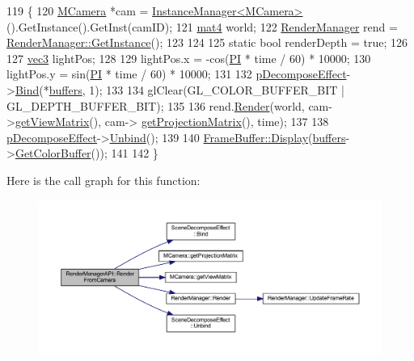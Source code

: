 \begin{DoxyCode}
119 \{
120     \hyperlink{class_m_camera}{MCamera} *cam = \hyperlink{class_instance_manager}{InstanceManager<MCamera>}().GetInstance().GetInst(camID);
121     \hyperlink{_types_8h_a2db59f395fe82a7394c6324956c265d8}{mat4} world;
122     \hyperlink{class_render_manager}{RenderManager} rend = \hyperlink{class_singleton_a74f32751d99bf3cc95fe17aba11f4b07}{RenderManager::GetInstance}();
123 
124 
125     \textcolor{keyword}{static} \textcolor{keywordtype}{bool} renderDepth = \textcolor{keyword}{true};
126         
127     \hyperlink{_types_8h_a3d0ce73e3199de81565fb01632415288}{vec3} lightPos;
128 
129     lightPos.x = -cos(\hyperlink{_m_math_8h_a598a3330b3c21701223ee0ca14316eca}{PI} * time / 60) * 10000;
130     lightPos.y = sin(\hyperlink{_m_math_8h_a598a3330b3c21701223ee0ca14316eca}{PI} * time / 60) * 10000;
131         
132     \hyperlink{_render_manager_a_p_i_8cpp_a7cab16375909f127703d305e85ccf50b}{pDecomposeEffect}->\hyperlink{class_scene_decompose_effect_a2c2bbdba7d4a8cbe1988f56b02754118}{Bind}(*\hyperlink{_render_manager_a_p_i_8cpp_a3e255706d276f815cf3fbafbbfe660f8}{buffers}, 1);
133             
134     glClear(GL\_COLOR\_BUFFER\_BIT | GL\_DEPTH\_BUFFER\_BIT);
135         
136     rend.\hyperlink{class_render_manager_aa51d440b124cf2a1744655b1b24369f5}{Render}(world, cam->\hyperlink{class_m_camera_ade7b040e08bdddc5fdc92d55c55b5413}{getViewMatrix}(), cam->
      \hyperlink{class_m_camera_a29193c7d70b0922abceb288c1aefcb81}{getProjectionMatrix}(), time);
137             
138     \hyperlink{_render_manager_a_p_i_8cpp_a7cab16375909f127703d305e85ccf50b}{pDecomposeEffect}->\hyperlink{class_scene_decompose_effect_a92108d282bf0f2d7f3b3889ee64cf77c}{Unbind}();
139         
140     \hyperlink{class_frame_buffer_aa71789f57e31a8f54f8ff2e9067afdb2}{FrameBuffer::Display}(\hyperlink{_render_manager_a_p_i_8cpp_a3e255706d276f815cf3fbafbbfe660f8}{buffers}->\hyperlink{class_g_buffer_ab66bacfa4a41125ff8327313620a705b}{GetColorBuffer}());       
141 
142 \}
\end{DoxyCode}


Here is the call graph for this function\+:
\nopagebreak
\begin{figure}[H]
\begin{center}
\leavevmode
\includegraphics[width=350pt]{class_render_manager_a_p_i_aa7db1e8156b186062c635debf2d8776d_cgraph}
\end{center}
\end{figure}


